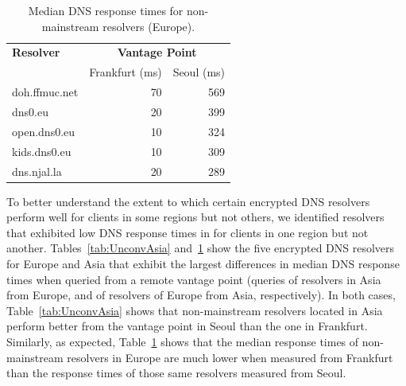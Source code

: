 \begin{table}[t!]
\centering
\begin{tabular}{l|rr}
\toprule
\textbf{Resolver} & \multicolumn{2}{c}{\textbf{Vantage Point}} \\
                  & \textrm{Frankfurt (ms)}     & \textrm{Seoul (ms)} \\
\midrule
doh.ffmuc.net                               & 70 & 569                         \\
dns0.eu                        & 20 & 399                         \\
open.dns0.eu         & 10 & 324                         \\
kids.dns0.eu                                 & 10 & 309                         \\
dns.njal.la                        & 20 & 289                         \\
\bottomrule
\end{tabular}
    \caption{Median DNS response times for non-mainstream resolvers (Europe).}
\label{tab:UnconvEur}
\end{table}


To better understand the extent to which certain encrypted DNS resolvers
perform well for clients in some regions but not others, we identified
resolvers that exhibited low DNS response times in for clients in one region
but not another. 
Tables~\ref{tab:UnconvAsia} and~\ref{tab:UnconvEur} show 
the five encrypted DNS resolvers for Europe and Asia that exhibit the 
largest differences in median DNS response times when
queried from a remote vantage point (queries of resolvers in Asia from Europe,
and of resolvers of Europe from Asia, respectively). In both cases, 
Table~\ref{tab:UnconvAsia} shows that non-mainstream resolvers located
in Asia perform better from the vantage point in Seoul than the one in
Frankfurt.  Similarly, as expected, Table~\ref{tab:UnconvEur} shows that the
median response times of non-mainstream resolvers in Europe are much lower when
measured from Frankfurt than the response times of those same resolvers
measured from Seoul.
